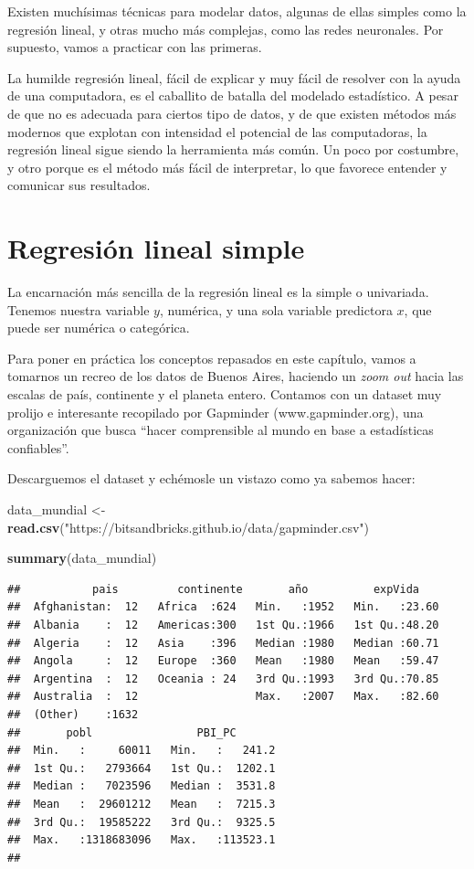 \documentclass[]{book}
\newenvironment{Shaded}{\begin{snugshade}}{\end{snugshade}}
\newcommand{\KeywordTok}[1]{\textcolor[rgb]{0.13,0.29,0.53}{\textbf{#1}}}
\newcommand{\StringTok}[1]{\textcolor[rgb]{0.31,0.60,0.02}{#1}}
\newcommand{\NormalTok}[1]{#1}
\begin{document}
Existen muchísimas técnicas para modelar datos, algunas de ellas simples
como la regresión lineal, y otras mucho más complejas, como las redes
neuronales. Por supuesto, vamos a practicar con las primeras.

La humilde regresión lineal, fácil de explicar y muy fácil de resolver
con la ayuda de una computadora, es el caballito de batalla del modelado
estadístico. A pesar de que no es adecuada para ciertos tipo de datos, y
de que existen métodos más modernos que explotan con intensidad el
potencial de las computadoras, la regresión lineal sigue siendo la
herramienta más común. Un poco por costumbre, y otro porque es el método
más fácil de interpretar, lo que favorece entender y comunicar sus
resultados.

\section{Regresión lineal simple}\label{regresion-lineal-simple}

La encarnación más sencilla de la regresión lineal es la simple o
univariada. Tenemos nuestra variable \(y\), numérica, y una sola
variable predictora \(x\), que puede ser numérica o categórica.

Para poner en práctica los conceptos repasados en este capítulo, vamos a
tomarnos un recreo de los datos de Buenos Aires, haciendo un \emph{zoom
out} hacia las escalas de país, continente y el planeta entero. Contamos
con un dataset muy prolijo e interesante recopilado por Gapminder
(www.gapminder.org), una organización que busca ``hacer comprensible al
mundo en base a estadísticas confiables''.

Descarguemos el dataset y echémosle un vistazo como ya sabemos hacer:

\begin{Shaded}
\begin{Highlighting}[]
\NormalTok{data_mundial <-}\StringTok{ }\KeywordTok{read.csv}\NormalTok{(}\StringTok{"https://bitsandbricks.github.io/data/gapminder.csv"}\NormalTok{)}

\KeywordTok{summary}\NormalTok{(data_mundial)}
\end{Highlighting}
\end{Shaded}

\begin{verbatim}
##           pais         continente       año          expVida     
##  Afghanistan:  12   Africa  :624   Min.   :1952   Min.   :23.60  
##  Albania    :  12   Americas:300   1st Qu.:1966   1st Qu.:48.20  
##  Algeria    :  12   Asia    :396   Median :1980   Median :60.71  
##  Angola     :  12   Europe  :360   Mean   :1980   Mean   :59.47  
##  Argentina  :  12   Oceania : 24   3rd Qu.:1993   3rd Qu.:70.85  
##  Australia  :  12                  Max.   :2007   Max.   :82.60  
##  (Other)    :1632                                                
##       pobl                PBI_PC        
##  Min.   :     60011   Min.   :   241.2  
##  1st Qu.:   2793664   1st Qu.:  1202.1  
##  Median :   7023596   Median :  3531.8  
##  Mean   :  29601212   Mean   :  7215.3  
##  3rd Qu.:  19585222   3rd Qu.:  9325.5  
##  Max.   :1318683096   Max.   :113523.1  
## 
\end{verbatim}
\end{document}
